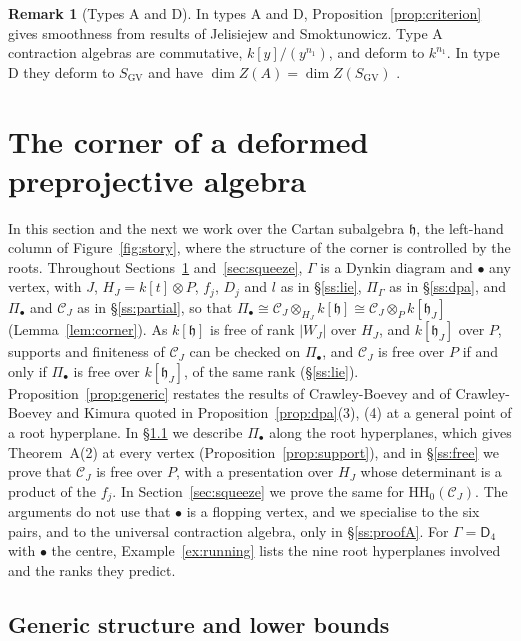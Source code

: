 \documentclass[11pt]{amsart}
\numberwithin{table}{section}
\numberwithin{figure}{section}
\numberwithin{equation}{section}
\theoremstyle{definition}
\newtheorem{rem}[thm]{Remark}
\theoremstyle{plain}
\newcommand{\cC}{\mathcal{C}}
\newcommand{\h}{\mathfrak{h}}
\newcommand{\bul}{\bullet}
\newcommand{\SGV}{S_{\mathrm{GV}}}
\newcommand{\HH}{\mathrm{HH}}
\begin{document}
\begin{rem}[Types A and D]\label{rem:AD}
In types A and D, Proposition~\ref{prop:criterion} gives smoothness from results of Jelisiejew and Smoktunowicz. Type A contraction algebras are commutative, $k[y]/(y^{n_1})$, and deform to $k^{n_1}$. In type D they deform to $\SGV$ and have $\dim Z(A) = \dim Z(\SGV)$ \cite[Rem~3.4, Thms~3.7, 3.13]{JS}.
\end{rem}
%
\section{The corner of a deformed preprojective algebra}\label{sec:cartan}

In this section and the next we work over the Cartan subalgebra $\h$, the left-hand column of Figure~\ref{fig:story}, where the structure of the corner is controlled by the roots. Throughout Sections~\ref{sec:cartan} and~\ref{sec:squeeze}, $\Gamma$ is a Dynkin diagram and $\bul$ any vertex, with $J$, $H_J = k[t] \otimes P$, $f_j$, $D_j$ and $l$ as in \S\ref{ss:lie}, $\Pi_\Gamma$ as in \S\ref{ss:dpa}, and $\Pi_\bul$ and $\cC_J$ as in \S\ref{ss:partial}, so that $\Pi_\bul \cong \cC_J \otimes_{H_J} k[\h] \cong \cC_J \otimes_P k[\h_J]$ (Lemma~\ref{lem:corner}). As $k[\h]$ is free of rank $|W_J|$ over $H_J$, and $k[\h_J]$ over $P$, supports and finiteness of $\cC_J$ can be checked on $\Pi_\bul$, and $\cC_J$ is free over $P$ if and only if $\Pi_\bul$ is free over $k[\h_J]$, of the same rank (\S\ref{ss:lie}). Proposition~\ref{prop:generic} restates the results of Crawley-Boevey and of Crawley-Boevey and Kimura quoted in Proposition~\ref{prop:dpa}(3), (4) at a general point of a root hyperplane. In \S\ref{ss:generic} we describe $\Pi_\bul$ along the root hyperplanes, which gives Theorem~A(2) at every vertex (Proposition~\ref{prop:support}), and in \S\ref{ss:free} we prove that $\cC_J$ is free over $P$, with a presentation over $H_J$ whose determinant is a product of the $f_j$. In Section~\ref{sec:squeeze} we prove the same for $\HH_0(\cC_J)$. The arguments do not use that $\bul$ is a flopping vertex, and we specialise to the six pairs, and to the universal contraction algebra, only in \S\ref{ss:proofA}. For $\Gamma = \mathsf{D}_4$ with $\bul$ the centre, Example~\ref{ex:running} lists the nine root hyperplanes involved and the ranks they predict.

\subsection{Generic structure and lower bounds}\label{ss:generic}
\end{document}
